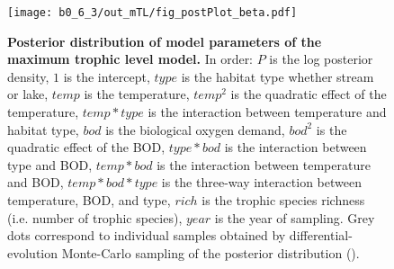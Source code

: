 \documentclass[11pt, oneside]{article}
\begin{document}
\begin{figure}[H]
\begin{center}
\texttt{[image: b0\_6\_3/out\_mTL/fig\_postPlot\_beta.pdf]}
\caption{
    \textbf{Posterior distribution of model parameters of the maximum trophic level model.}
    In order: $P$ is the log posterior density, $1$ is the intercept, $type$ is the habitat type whether stream or lake, $temp$ is the temperature, $temp^2$ is the quadratic effect of the temperature, $temp * type$ is the interaction between temperature and habitat type, $bod$ is the biological oxygen demand, $bod^2$ is the quadratic effect of the BOD, $type * bod$ is the interaction between type and BOD, $temp * bod$ is the interaction between temperature and BOD, $temp * bod * type$ is the three-way interaction between temperature, BOD, and type, $rich$ is the trophic species richness (i.e. number of trophic species), $year$ is the year of sampling.
    Grey dots correspond to individual samples obtained by differential-evolution Monte-Carlo sampling of the posterior distribution (\cite{TerBraak2006}). 
} 
\end{center}
\end{figure}
\end{document}
